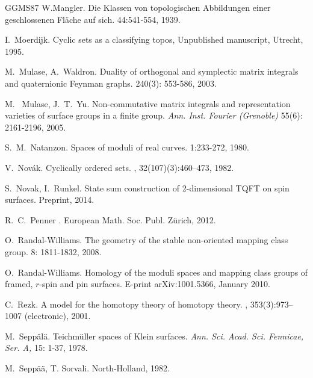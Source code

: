 \documentclass[english,11pt,leqno]{article}
\theoremstyle{definition}
\theoremstyle{remark}
\numberwithin{equation}{section}
\begin{document}
\begin{thebibliography}{GGMS87}
  W.Mangler.
 \newblock Die Klassen von topologischen Abbildungen einer
 geschlossenen Fl\"ache auf sich.
  44:541-554, 1939. 

 I.~Moerdijk.
 \newblock
  Cyclic sets as a classifying topos, 
  \newblock Unpublished manuscript, Utrecht, 1995.
 


 M.~Mulase, A.~Waldron.
 \newblock
 Duality of orthogonal and symplectic matrix integrals and quaternionic Feynman graphs.
  240(3):   553-586, 2003. 

M.~ Mulase, J.~T.~Yu.
\newblock
 Non-commutative matrix integrals and representation varieties of surface groups in a finite group. 
 \newblock
 {\em Ann. Inst. Fourier (Grenoble) } 55(6):  2161-2196, 2005. 
  
 
  S.~M.~Natanzon. \newblock
  Spaces of moduli of real curves. 
   1:233-272, 1980. 

V.~Nov{\'a}k.
\newblock Cyclically ordered sets.
, 32(107)(3):460--473, 1982.

 S.~Novak, I.~Runkel.
\newblock State sum construction of 2-dimensional TQFT on spin surfaces.
\newblock Preprint, 2014. 

 
  R.~C.~Penner
 .
 \newblock European Math. Soc. Publ. Z\"urich, 2012.
 
  O.~Randal-Williams.
 \newblock The geometry of the stable non-oriented mapping class group.
  8: 1811-1832, 2008.
 
  O.~Randal-Williams.
 \newblock
 Homology of the moduli spaces and mapping class groups of framed, $r$-spin
 and pin surfaces.
 \newblock E-print arXiv:1001.5366, January 2010. 

C.~Rezk.
\newblock A model for the homotopy theory of homotopy theory.
, 353(3):973--1007 (electronic), 2001.
 
  M.~Sepp\"al\"a.
 \newblock Teichm\"uller spaces of Klein surfaces.
 \newblock
 {\em Ann. Sci. Acad. Sci. Fennicae, Ser. A, }15: 1-37, 1978. 
 
   M.~Sepp\"a\"a, T. Sorvali.
  \newblock North-Holland, 1982. 
  

\end{thebibliography}
\end{document}

